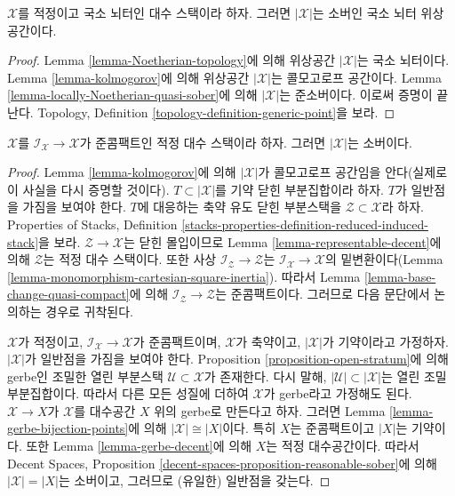 \begin{lemma}
\label{lemma-decent-locally-noetherian-sober}
$\mathcal{X}$를 적정이고 국소 뇌터인 대수 스택이라 하자.
그러면 $|\mathcal{X}|$는 소버인 국소 뇌터 위상공간이다.
\end{lemma}

\begin{proof}
Lemma \ref{lemma-Noetherian-topology}에 의해 위상공간 $|\mathcal{X}|$는
국소 뇌터이다. Lemma \ref{lemma-kolmogorov}에 의해 위상공간
$|\mathcal{X}|$는 콜모고로프 공간이다. Lemma
\ref{lemma-locally-Noetherian-quasi-sober}에 의해
$|\mathcal{X}|$는 준소버이다. 이로써 증명이 끝난다. Topology, Definition
\ref{topology-definition-generic-point}을 보라.
\end{proof}

\begin{proposition}
\label{proposition-decent-sober}
$\mathcal{X}$를 $\mathcal{I}_\mathcal{X} \to \mathcal{X}$가 준콤팩트인
적정 대수 스택이라 하자. 그러면 $|\mathcal{X}|$는 소버이다.
\end{proposition}

\begin{proof}
Lemma \ref{lemma-kolmogorov}에 의해 $|\mathcal{X}|$가 콜모고로프 공간임을
안다(실제로 이 사실을 다시 증명할 것이다).
$T \subset |\mathcal{X}|$를 기약 닫힌 부분집합이라 하자.
$T$가 일반점을 가짐을 보여야 한다. $T$에 대응하는 축약 유도 닫힌
부분스택을 $\mathcal{Z} \subset \mathcal{X}$라 하자. Properties of Stacks,
Definition \ref{stacks-properties-definition-reduced-induced-stack}을 보라.
$\mathcal{Z} \to \mathcal{X}$는 닫힌 몰입이므로 Lemma
\ref{lemma-representable-decent}에 의해 $\mathcal{Z}$는 적정 대수 스택이다.
또한 사상 $\mathcal{I}_\mathcal{Z} \to \mathcal{Z}$는
$\mathcal{I}_\mathcal{X} \to \mathcal{X}$의 밑변환이다(Lemma
\ref{lemma-monomorphism-cartesian-square-inertia}). 따라서 Lemma
\ref{lemma-base-change-quasi-compact}에 의해
$\mathcal{I}_\mathcal{Z} \to \mathcal{Z}$는 준콤팩트이다.
그러므로 다음 문단에서 논의하는 경우로 귀착된다.

\medskip\noindent
$\mathcal{X}$가 적정이고,
$\mathcal{I}_\mathcal{X} \to \mathcal{X}$가 준콤팩트이며,
$\mathcal{X}$가 축약이고, $|\mathcal{X}|$가 기약이라고 가정하자.
$|\mathcal{X}|$가 일반점을 가짐을 보여야 한다.
Proposition \ref{proposition-open-stratum}에 의해 gerbe인 조밀한 열린
부분스택 $\mathcal{U} \subset \mathcal{X}$가 존재한다. 다시 말해,
$|\mathcal{U}| \subset |\mathcal{X}|$는 열린 조밀 부분집합이다.
따라서 다른 모든 성질에 더하여 $\mathcal{X}$가 gerbe라고 가정해도 된다.
$\mathcal{X} \to X$가 $\mathcal{X}$를 대수공간 $X$ 위의 gerbe로 만든다고
하자. 그러면 Lemma \ref{lemma-gerbe-bijection-points}에 의해
$|\mathcal{X}| \cong |X|$이다. 특히 $X$는 준콤팩트이고 $|X|$는
기약이다. 또한 Lemma \ref{lemma-gerbe-decent}에 의해 $X$는 적정
대수공간이다. 따라서 Decent Spaces, Proposition
\ref{decent-spaces-proposition-reasonable-sober}에 의해
$|\mathcal{X}| = |X|$는 소버이고, 그러므로 (유일한) 일반점을 갖는다.
\end{proof}






